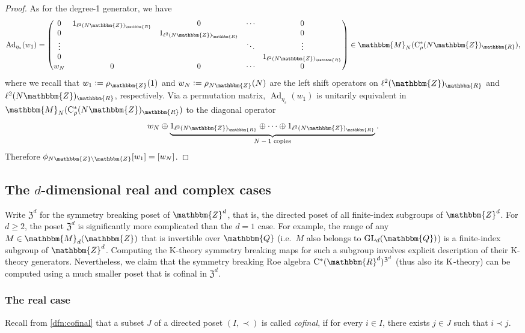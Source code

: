 \documentclass{amsart}
\numberwithin{figure}{section}
\numberwithin{equation}{section}
\numberwithin{table}{section}
\theoremstyle{plain}
\theoremstyle{definition}
\theoremstyle{remark}
\theoremstyle{nonumber}
\newcommand{\Z}{\mathbb{Z}}
\newcommand{\Q}{\mathbb{Q}}
\newcommand{\R}{\mathbb{R}}
\newcommand{\Mat}{\mathbb{M}}
\newcommand{\K}{\relax\ifmmode\operatorname{K}\else\textup{K}\fi}
\newcommand{\Cst}{\relax\ifmmode\mathrm{C}^*\else\textup{C*}\fi}
\newcommand{\Cstr}{\Cst_\rho} %
\newcommand{\GL}{\mathrm{GL}}
\newcommand{\Ad}{\operatorname{Ad}} %
\newcommand{\defeq}{\mathrel{\vcentcolon=}}
\renewcommand{\mathbb}{\mathbbm} %
\begin{document}
\begin{proof}
As for the degree-1 generator, we have
\begin{equation}\label{eq:1D.translation.broken.matrix}
    \Ad_{\eta_s}(w_1)=\begin{pmatrix}
    0 & 1_{\ell^2(N\Z)_\R} & 0 &\cdots & 0 \\
    0 &  & 1_{\ell^2(N\Z)_\R} & & 0 \\
      \vdots & & & \ddots & \vdots \\
    0 & & & & 1_{\ell^2(N\Z)_\R}\\
    w_N & 0 & 0 & \cdots & 0
    \end{pmatrix}\in\Mat_N(\Cstr(N\Z)_\R),
\end{equation}
where we recall that \( w_1\defeq \rho_{\Z}(1) \) and
$w_N\defeq \rho_{N\Z}(N)$ are the left shift operators on
\( \ell^2(\Z)_\R \) and \( \ell^2(N\Z)_\R \), respectively.
Via a permutation matrix, \(
\Ad_{\eta_s}(w_1) \) is unitarily equivalent in 
$\Mat_N(\Cstr(N\Z)_\R)$ to the diagonal operator
\[ 
  w_N\oplus
  \underbrace{1_{\ell^2(N\Z)_\R}\oplus \cdots \oplus
  1_{\ell^2(N\Z)_\R}}_\text{\( N-1 \)\ copies}.
\]
Therefore \( \phi_{N\Z\backslash \Z}[w_1]=[w_N] \).
\end{proof}

\subsection{The \(d\)-dimensional real and complex cases}
\label{sec:d-dim}
Write \( \mathfrak{Z}^d \) for the symmetry breaking
poset of \( \Z^d \), that is, the directed poset of all finite-index
subgroups of \( \Z^d \). For \(d\geq 2\), the poset $\mathfrak{Z}^d$ is
significantly more complicated than the $d=1$ case. For example, the range
of any \( M\in\Mat_{d}(\Z) \) that is invertible over \( \Q \)
(i.e.~\( M \) also belongs to \( \GL_{d}(\Q) \)) is a finite-index
subgroup of \( \Z^d \). Computing the K-theory symmetry breaking maps for
such a subgroup involves explicit description of their K-theory generators.
Nevertheless, we claim that the symmetry breaking Roe algebra \(
\Cst(\R^d)^{\mathfrak{Z}^d} \) (thus also its $\K$-theory) can be computed
using a much smaller poset that is cofinal in \(
\mathfrak{Z}^d \). 

\subsubsection{The real case}
\label{sec:real_d-dim}

Recall from \cref{dfn:cofinal} that 
a subset \( J \) of a directed poset \(
(I,\prec) \) is called \emph{cofinal}, if for every \(
i\in I \), there exists \( j\in J \) such that \(
i\prec j \).
\end{document}
